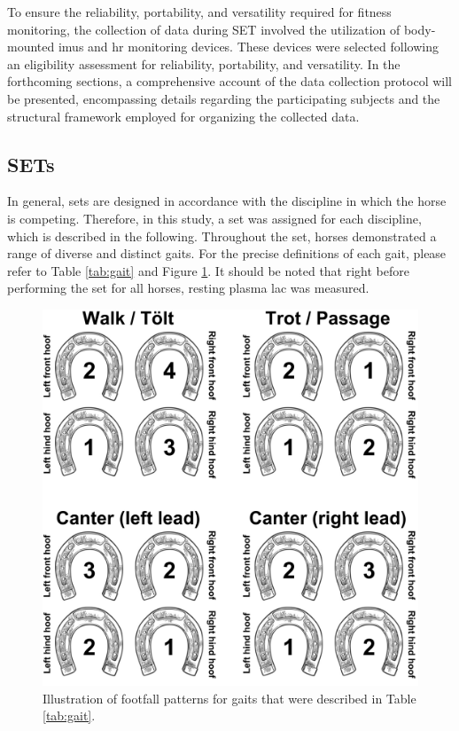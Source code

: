 To ensure the reliability, portability, and versatility required for fitness monitoring, the collection of data during SET involved the utilization of body-mounted \gls{imu}s and \gls{hr} monitoring devices. These devices were selected following an eligibility assessment for reliability, portability, and versatility. In the forthcoming sections, a comprehensive account of the data collection protocol will be presented, encompassing details regarding the participating subjects and the structural framework employed for organizing the collected data.

\subsection{SETs} \label{sec:trainingprotocol}

In general, \gls{set}s are designed in accordance with the discipline in which the horse is competing. Therefore, in this study, a \gls{set} was assigned for each discipline, which is described in the following. Throughout the \gls{set}, horses demonstrated a range of diverse and distinct gaits. For the precise definitions of each gait, please refer to Table \ref{tab:gait} and Figure \ref{fig:horseshoe}. It should be noted that right before performing the \gls{set} for all horses, resting plasma \gls{lac} was measured.



\begin{figure}[!tbp]
\centering
\includegraphics[scale=0.1]{chapters/data/figures/Horseshoe.png}
\caption{Illustration of footfall patterns for gaits that were described in Table \ref{tab:gait}.}
\label{fig:horseshoe}
\end{figure}


